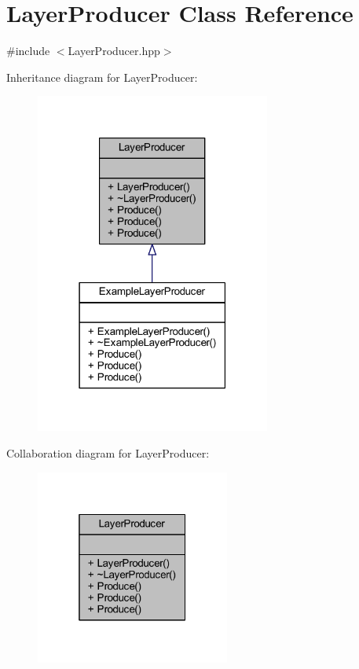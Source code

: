 \hypertarget{class_layer_producer}{\section{Layer\-Producer Class Reference}
\label{class_layer_producer}
}


{\ttfamily \#include $<$Layer\-Producer.\-hpp$>$}



Inheritance diagram for Layer\-Producer\-:\nopagebreak
\begin{figure}[H]
\begin{center}
\leavevmode
\includegraphics[width=219pt]{class_layer_producer__inherit__graph}
\end{center}
\end{figure}


Collaboration diagram for Layer\-Producer\-:\nopagebreak
\begin{figure}[H]
\begin{center}
\leavevmode
\includegraphics[width=181pt]{class_layer_producer__coll__graph}
\end{center}
\end{figure}

